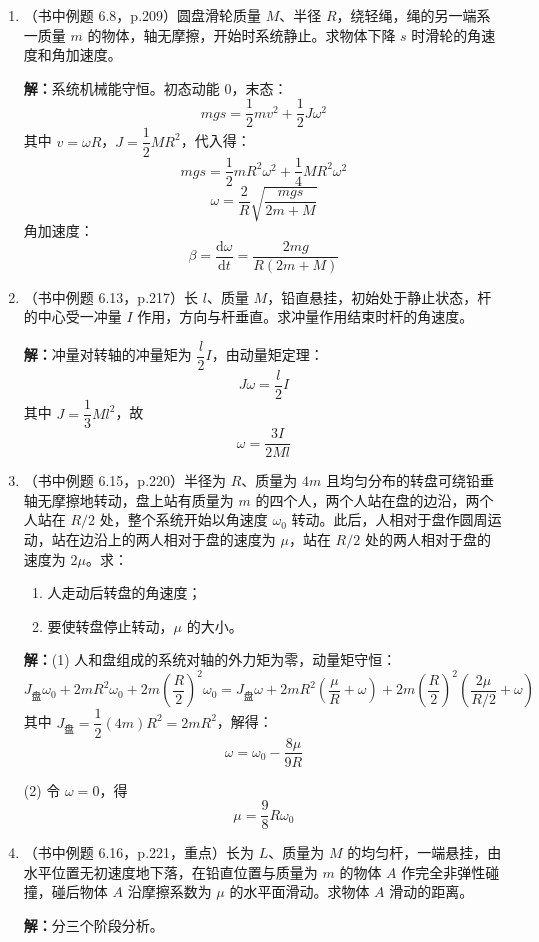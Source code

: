 \documentclass{ctexart}
\begin{document}
\begin{enumerate}
\item（书中例题 6.8，p.209）圆盘滑轮质量 $M$、半径 $R$，绕轻绳，绳的另一端系一质量 $m$ 的物体，轴无摩擦，开始时系统静止。求物体下降 $s$ 时滑轮的角速度和角加速度。

\textbf{解：}系统机械能守恒。初态动能 $0$，末态：
\[
mgs = \frac12 mv^{2} + \frac12 J\omega^{2}
\]
其中 $v = \omega R$，$J = \dfrac12 MR^{2}$，代入得：
\[
mgs = \frac12 mR^{2}\omega^{2} + \frac14 MR^{2}\omega^{2}
\]
\[
\omega = \frac{2}{R}\sqrt{\frac{mgs}{2m+M}}
\]
角加速度：
\[
\beta = \frac{\mathrm{d}\omega}{\mathrm{d}t} = \frac{2mg}{R(2m+M)}
\]

\item（书中例题 6.13，p.217）长 $l$、质量 $M$，铅直悬挂，初始处于静止状态，杆的中心受一冲量 $I$ 作用，方向与杆垂直。求冲量作用结束时杆的角速度。

\textbf{解：}冲量对转轴的冲量矩为 $\dfrac{l}{2}I$，由动量矩定理：
\[
J\omega = \frac{l}{2}I
\]
其中 $J = \dfrac13 Ml^{2}$，故
\[
\omega = \frac{3I}{2Ml}
\]

\item（书中例题 6.15，p.220）半径为 $R$、质量为 $4m$ 且均匀分布的转盘可绕铅垂轴无摩擦地转动，盘上站有质量为 $m$ 的四个人，两个人站在盘的边沿，两个人站在 $R/2$ 处，整个系统开始以角速度 $\omega_0$ 转动。此后，人相对于盘作圆周运动，站在边沿上的两人相对于盘的速度为 $\mu$，站在 $R/2$ 处的两人相对于盘的速度为 $2\mu$。求：
\begin{enumerate}
  \item 人走动后转盘的角速度；
  \item 要使转盘停止转动，$\mu$ 的大小。
\end{enumerate}

\textbf{解：}(1) 人和盘组成的系统对轴的外力矩为零，动量矩守恒：
\[
J_\text{盘}\omega_0 + 2mR^{2}\omega_0 + 2m\left(\frac{R}{2}\right)^{2}\omega_0
= J_\text{盘}\omega + 2mR^{2}\left(\frac{\mu}{R} + \omega\right) + 2m\left(\frac{R}{2}\right)^{2}\left(\frac{2\mu}{R/2} + \omega\right)
\]
其中 $J_\text{盘} = \dfrac12(4m)R^{2} = 2mR^{2}$，解得：
\[
\omega = \omega_0 - \frac{8\mu}{9R}
\]

(2) 令 $\omega = 0$，得
\[
\mu = \frac{9}{8}R\omega_0
\]

\item（书中例题 6.16，p.221，重点）长为 $L$、质量为 $M$ 的均匀杆，一端悬挂，由水平位置无初速度地下落，在铅直位置与质量为 $m$ 的物体 $A$ 作完全非弹性碰撞，碰后物体 $A$ 沿摩擦系数为 $\mu$ 的水平面滑动。求物体 $A$ 滑动的距离。

\textbf{解：}分三个阶段分析。


\end{enumerate}
\end{document}
